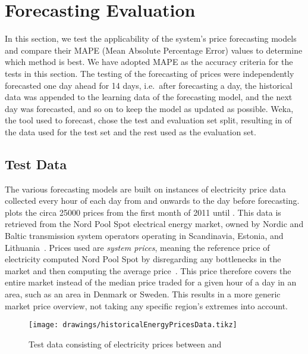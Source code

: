 \section{Forecasting Evaluation}\label{sec:forecasteval}
In this section, we test the applicability of the system's price forecasting models and compare their MAPE (Mean Absolute Percentage Error) values to determine which method is best. We have adopted MAPE as the accuracy criteria for the tests in this section. The testing of the forecasting of prices were independently forecasted one day ahead for 14 days, i.e.\ after forecasting a day, the historical data was appended to the learning data of the forecasting model, and the next day was forecasted, and so on to keep the model as updated as possible. Weka, the tool used to forecast, chose the test and evaluation set split, resulting in  of the data used for the test set and the rest used as the evaluation set.

\subsection{Test Data}
The various forecasting models are built on instances of electricity price data collected every hour of each day from \protect{} and onwards to the day before forecasting.  plots the circa \num{25000} prices from the first month of 2011 until \protect{}. This data is retrieved from the Nord Pool Spot electrical energy market, owned by Nordic and Baltic transmission system operators operating in Scandinavia, Estonia, and Lithuania~\cite{nordPoolSpotTSOs}. Prices used are \emph{system prices}, meaning the reference price of electricity computed Nord Pool Spot by disregarding any bottlenecks in the market and then computing the average price~\cite{nordpoolSystem}. This price therefore covers the entire market instead of the median price traded for a given hour of a day in an area, such as an area in Denmark or Sweden. This results in a more generic market price overview, not taking any specific region's extremes into account.

\begin{figure}[htpb]
  \centering
  \texttt{[image: drawings/historicalEnergyPricesData.tikz]}
  \caption{Test data consisting of electricity prices between \protect{}  and \protect{} }\label{fig:realEnergyPrices}
\end{figure}

